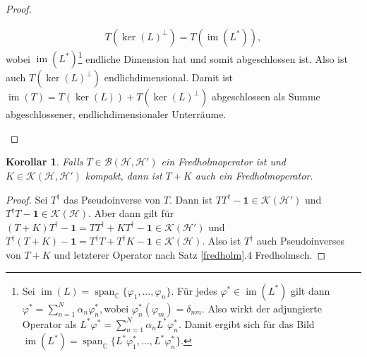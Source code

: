 \documentclass[11pt, hidelinks]{article}
\newcommand{\h}{\mathcal{H}}
\newcommand{\im}{\operatorname{im}}
\numberwithin{conj}{section}
\newtheorem{corollary}[conj]{Korollar}
\begin{document}
\begin{proof}
\begin{itemize}
    \begin{align}
        T(\ker(L)^\perp) = T(\im(L^\ast)),
    \end{align}
    wobei $\im(L^\ast)$\footnote{Sei $\im(L) = \operatorname{span}_\mathbb{C}\{\varphi_1, \dots, \varphi_n\}$. Für jedes \( \varphi^\ast \in \im(L^\ast) \) gilt dann $\varphi^\ast = \sum_{n=1}^N \alpha_n \varphi_n^\ast, \text{wobei } \varphi_n^\ast(\varphi_m) = \delta_{nm}$. Also wirkt der adjungierte Operator als $L^\ast \varphi^\ast = \sum_{n=1}^N \alpha_n L^\ast \varphi_n^\ast$. Damit ergibt sich für das Bild \( \im(L^\ast) = \operatorname{span}_{\mathbb{C}}\{L^\ast \varphi_1^\ast, \dots, L^\ast \varphi_n^\ast\} \).} endliche Dimension hat und somit abgeschlossen ist. Also ist auch $T(\ker(L)^\perp)$ endlichdimensional. Damit ist $\im(T) = T(\ker(L)) + T(\ker(L)^\perp)$ abgeschlossen als Summe abgeschlossener, endlichdimensionaler Unterräume.
\end{itemize}
\end{proof}

\begin{corollary}
    \label{summeFredholm}
    Falls $T \in \mathcal{B}(\h,\h')$ ein Fredholmoperator ist und $K \in \mathcal{K}(\h,\h')$ kompakt, dann ist $T+K$ auch ein Fredholmoperator. 
\end{corollary}

\begin{proof}
Sei $T^\dagger$ das Pseudoinverse von $T$. Dann ist $TT^\dagger - \mathbf{1} \in \mathcal{K}(\h')$ und $T^\dagger T - \mathbf{1} \in \mathcal{K}(\h)$. Aber dann gilt für $(T+K)T^\dagger - \mathbf{1} = TT^\dagger + KT^\dagger - \mathbf{1} \in \mathcal{K}(\h')$ und $T^\dagger (T+K) -\mathbf{1} = T^\dagger T+ T^\dagger K -\mathbf{1}  \in \mathcal{K}(\h)$. Also ist $T^\dagger$ auch Pseudoinverses von $T+K$ und letzterer Operator nach Satz \ref{fredholm}.4 Fredholmsch.
\end{proof}
\end{document}
